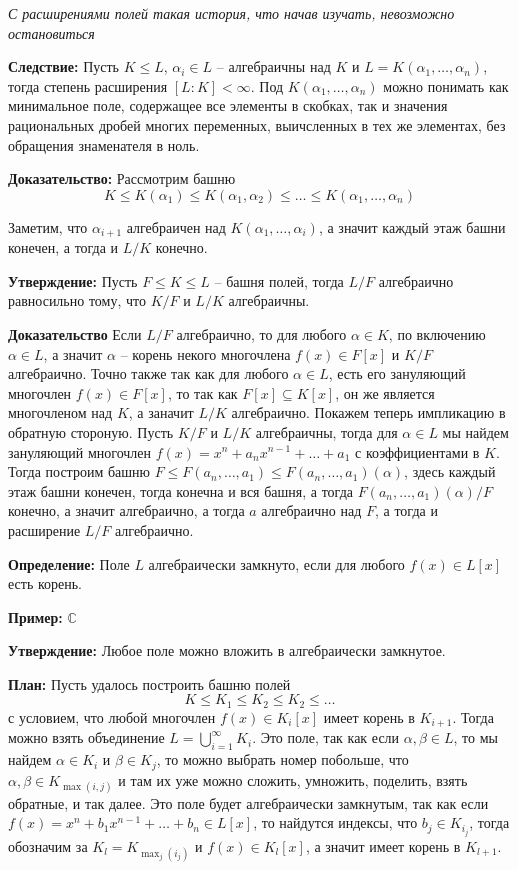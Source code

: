 \documentclass[a4paper, 12pt]{book}
\begin{document}
\textit{С расширениями полей такая история, что начав изучать, невозможно остановиться}

\textbf{Следствие:} Пусть $K\le L$, $\alpha_i\in L$ – алгебраичны над $K$ и 
$L=K(\alpha_1,\ldots,\alpha_n)$, тогда степень расширения $[L:K]<\infty$. Под
$K(\alpha_1,\ldots,\alpha_n)$ можно понимать как минимальное поле, содержащее
все элементы в скобках, так и значения рациональных дробей многих переменных,
выичсленных в тех же элементах, без обращения знаменателя в ноль.

\textbf{Доказательство:}  Рассмотрим башню
\[ K\le K(\alpha_1)\le K(\alpha_1, \alpha_2)\le\ldots\le K(\alpha_1,\ldots,\alpha_n)\]

Заметим, что $\alpha_{i+1}$ алгебраичен над $K(\alpha_1,\ldots,\alpha_i)$, а значит
каждый этаж башни конечен, а тогда и $L/K$ конечно.

\textbf{Утверждение:} Пусть $F\le K\le L$ – башня полей, тогда $L/F$
алгебраично равносильно тому, что $K/F$ и $L/K$ алгебраичны.

\textbf{Доказательство} Если $L/F$ алгебраично, то для любого $\alpha\in K$, по
включению $\alpha\in L$, а значит $\alpha$ – корень некого многочлена $f(x)\in
F[x]$ и $K/F$ алгебраично. Точно также так как для любого $\alpha\in L$, есть
его зануляющий многочлен $f(x)\in F[x]$, то так как $F[x]\subseteq K[x]$, он
же является многочленом над $K$, а заначит $L/K$ алгебраично. Покажем теперь
импликацию в обратную стороную. Пусть $K/F$ и $L/K$ алгебраичны, тогда для 
$\alpha\in L$ мы найдем зануляющий многочлен $f(x)=x^n+a_nx^{n-1}+\ldots+a_1$
с коэффициентами в $K$. Тогда построим башню $F\le F(a_n,\ldots,a_1)\le
F(a_n,\ldots,a_1)(\alpha)$, здесь каждый этаж башни конечен, тогда конечна и
вся башня, а тогда $F(a_n,\ldots,a_1)(\alpha)/F$ конечно, а значит алгебраично,
а тогда $a$ алгебраично над $F$, а тогда и расширение $L/F$ алгебраично.

\textbf{Определение:} Поле $L$ алгебраически замкнуто, если для любого $f(x)\in
L[x]$ есть корень.

\textbf{Пример:} $\mathbb{C}$

\textbf{Утверждение:} Любое поле можно вложить в алгебраически замкнутое.

\textbf{План:} Пусть удалось построить башню полей
\[K\le K_1\le K_2\le K_2\le \ldots\]
с условием, что любой многочлен $f(x)\in K_i[x]$ имеет корень в $K_{i+1}$.
Тогда можно взять объединение $L=\bigcup_{i=1}^\infty K_i$. Это поле, так как
если $\alpha,\beta\in L$, то мы найдем $\alpha\in K_i$ и $\beta\in K_j$, то
можно выбрать номер побольше, что $\alpha,\beta\in K_{\max(i,j)}$ и там их уже
можно сложить, умножить, поделить, взять обратные, и так далее. Это поле будет
алгебраически замкнутым, так как если $f(x)=x^n+b_1x^{n-1}+\ldots+b_n\in L[x]$,
то найдутся индексы, что $b_j\in K_{i_j}$, тогда обозначим за $K_l=K_{\max_j(i_j)}$
и $f(x)\in K_l[x]$, а значит имеет корень в $K_{l+1}$.
\end{document}
